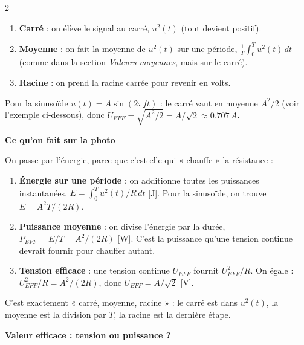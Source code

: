 \documentclass[a4paper,9pt]{extarticle}
\begin{document}
\begin{multicols}{2}
\begin{important}
\begin{enumerate}[leftmargin=*,itemsep=1pt,topsep=1pt]

\item \textbf{Carré} : on élève le signal au carré, $u^2(t)$ (tout devient positif).

\item \textbf{Moyenne} : on fait la moyenne de $u^2(t)$ sur une période, $\frac{1}{T}\int_0^T u^2(t)\,dt$ (comme dans la section \textit{Valeurs moyennes}, mais sur le carré).

\item \textbf{Racine} : on prend la racine carrée pour revenir en volts.

\end{enumerate}

Pour la sinusoïde $u(t) = A\sin(2\pi f t)$ : le carré vaut en moyenne $A^2/2$ (voir l'exemple ci-dessous), donc $U_{EFF} = \sqrt{A^2/2} = A/\sqrt{2} \approx 0.707\,A$.

\vspace{3pt}

\textbf{Ce qu'on fait sur la photo}

On passe par l'énergie, parce que c'est elle qui « chauffe » la résistance :

\begin{enumerate}[leftmargin=*,itemsep=1pt,topsep=1pt]

\item \textbf{Énergie sur une période} : on additionne toutes les puissances instantanées, $E = \int_0^T u^2(t)/R\,dt$ [J]. Pour la sinusoïde, on trouve $E = A^2 T/(2R)$.

\item \textbf{Puissance moyenne} : on divise l'énergie par la durée, $P_{EFF} = E/T = A^2/(2R)$ [W]. C'est la puissance qu'une tension continue devrait fournir pour chauffer autant.

\item \textbf{Tension efficace} : une tension continue $U_{EFF}$ fournit $U_{EFF}^2/R$. On égale : $U_{EFF}^2/R = A^2/(2R)$, donc $U_{EFF} = A/\sqrt{2}$ [V].

\end{enumerate}

C'est exactement « carré, moyenne, racine » : le carré est dans $u^2(t)$, la moyenne est la division par $T$, la racine est la dernière étape.

\vspace{3pt}

\textbf{Valeur efficace : tension ou puissance ?}


\end{important}
\end{multicols}
\end{document}

